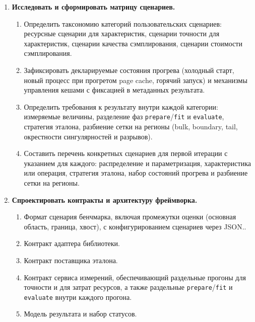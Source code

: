 \documentclass[12pt,a4paper]{article}
\begin{document}
\begin{enumerate}[label=\arabic*., leftmargin=*]

  \item \textbf{Исследовать и сформировать матрицу сценариев.}
  \begin{enumerate}[label=\arabic{enumi}.\arabic*., leftmargin=*]
    \item Определить таксономию категорий пользовательских сценариев:
          ресурсные сценарии для характеристик, сценарии точности
          для характеристик, сценарии качества сэмплирования,
          сценарии стоимости сэмплирования.
    \item Зафиксировать декларируемые состояния прогрева (холодный
          старт, новый процесс при прогретом page cache, горячий
          запуск) и механизмы управления кешами с фиксацией
          в метаданных результата.
    \item Определить требования к результату внутри каждой категории:
          измеряемые величины, разделение фаз
          \texttt{prepare}/\texttt{fit} и \texttt{evaluate}, стратегия
          эталона, разбиение сетки на регионы (bulk, boundary, tail,
          окрестности сингулярностей и разрывов).
    \item Составить перечень конкретных сценариев для первой итерации
          с указанием для каждого: распределение и параметризация,
          характеристика или операция, стратегия эталона, набор
          состояний прогрева и разбиение сетки на регионы.
  \end{enumerate}

  \item \textbf{Спроектировать контракты и архитектуру фреймворка.}
  \begin{enumerate}[label=\arabic{enumi}.\arabic*., leftmargin=*]
    \item Формат сценария бенчмарка, включая промежутки оценки
          (основная область, граница, хвост), с конфигурированием
          сценариев через JSON..
    \item Контракт адаптера библиотеки.
    \item Контракт поставщика эталона.
    \item Контракт сервиса измерений, обеспечивающий раздельные
      прогоны для точности и для затрат ресурсов, а также
      раздельные \texttt{prepare}/\texttt{fit} и \texttt{evaluate}
      внутри каждого прогона.
    \item Модель результата и набор статусов.
  \end{enumerate}


\end{enumerate}
\end{document}
